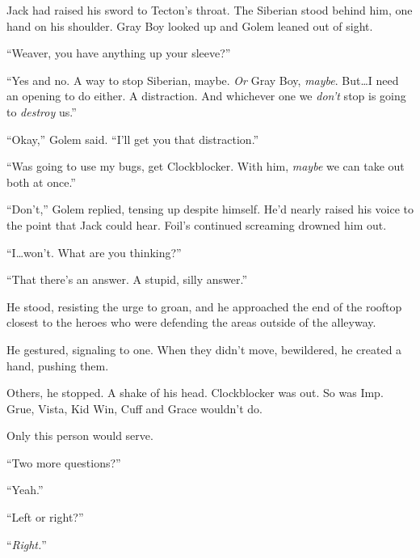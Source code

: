 Jack had raised his sword  to Tecton's throat.  The Siberian stood behind him, one hand on his shoulder.  Gray Boy looked up and Golem leaned out of sight.



``Weaver, you have anything up your sleeve?''



``Yes and no.  A way to stop Siberian, maybe.  \emph{Or }Gray Boy, \emph{maybe}.  But\ldots I need an opening to do either.  A distraction.  And whichever one we \emph{don't} stop is going to \emph{destroy} us.''



``Okay,'' Golem said.  ``I'll get you that distraction.''



``Was going to use my bugs, get Clockblocker.  With him, \emph{maybe }we can take out both at once.''



``Don't,'' Golem replied, tensing up despite himself.  He'd nearly raised his voice to the point that Jack could hear.  Foil's continued screaming drowned him out.



``I\ldots won't.  What are you thinking?''



``That there's an answer.  A stupid, silly answer.''



He stood, resisting the urge to groan, and he approached the end of the rooftop closest to the heroes who were defending the areas outside of the alleyway.



He gestured, signaling to one.  When they didn't move, bewildered, he created a hand, pushing them.



Others, he stopped.  A shake of his head.  Clockblocker was out.  So was Imp.  Grue, Vista, Kid Win, Cuff and Grace wouldn't do.



Only this person would serve.



``Two more questions?''



``Yeah.''



``Left or right?''



``\emph{Right.}''



